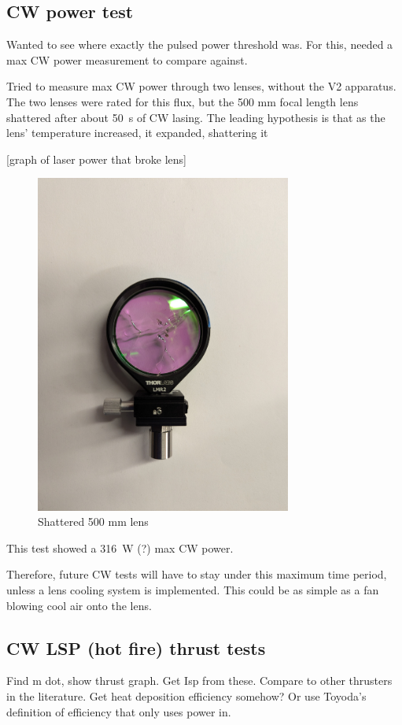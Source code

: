         \subsection{CW power test}

            Wanted to see where exactly the pulsed power threshold was. For this, needed a max CW power measurement to compare against. 

            Tried to measure max CW power through two lenses, without the V2 apparatus. The two lenses were rated for this flux, but the 500 mm focal length lens shattered after about \qty{50}{s} of CW lasing. The leading hypothesis is that as the lens' temperature increased, it expanded, shattering it

            [graph of laser power that broke lens]

            \begin{figure}
                \centering
                \includegraphics[width=0.75\textwidth]{assets/4 experiments/Shattered 500 mm lens.jpg}
                \caption{Shattered 500 mm lens}
            \end{figure}

            This test showed a \qty{316}{W} (?) max CW power.

            Therefore, future CW tests will have to stay under this maximum time period, unless a lens cooling system is implemented. This could be as simple as a fan blowing cool air onto the lens.


        \subsection{CW LSP (hot fire) thrust tests}

            Find m dot, show thrust graph. Get Isp from these. Compare to other thrusters in the literature. Get heat deposition efficiency somehow? Or use Toyoda's definition of efficiency that only uses power in.
 

            

        



